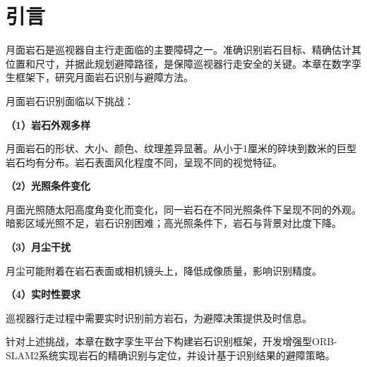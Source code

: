 \section{引言}
\label{sec:ch5_intro}

月面岩石是巡视器自主行走面临的主要障碍之一。准确识别岩石目标、精确估计其位置和尺寸，并据此规划避障路径，是保障巡视器行走安全的关键。本章在数字孪生框架下，研究月面岩石识别与避障方法。

月面岩石识别面临以下挑战：

\textbf{（1）岩石外观多样}

月面岩石的形状、大小、颜色、纹理差异显著。从小于1厘米的碎块到数米的巨型岩石均有分布。岩石表面风化程度不同，呈现不同的视觉特征。

\textbf{（2）光照条件变化}

月面光照随太阳高度角变化而变化，同一岩石在不同光照条件下呈现不同的外观。暗影区域光照不足，岩石识别困难；高光照条件下，岩石与背景对比度下降。

\textbf{（3）月尘干扰}

月尘可能附着在岩石表面或相机镜头上，降低成像质量，影响识别精度。

\textbf{（4）实时性要求}

巡视器行走过程中需要实时识别前方岩石，为避障决策提供及时信息。

针对上述挑战，本章在数字孪生平台下构建岩石识别框架，开发增强型ORB-SLAM2系统实现岩石的精确识别与定位，并设计基于识别结果的避障策略。
